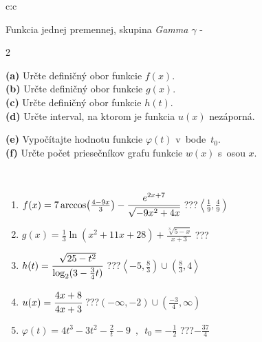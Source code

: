 \documentclass[10pt]{report}
\begin{document}
\begin{tabular}{c:c}
\begin{minipage}[c][104.5mm][t]{0.5\linewidth}
\begin{center}
\vspace{7mm}
{\huge Funkcia jednej premennej, skupina \textit{Gamma $\gamma$} -}\\[5mm]
\begin{minipage}{0.95\linewidth}
\begin{center}
{\small \begin{multicols}{2} \raggedright
\textbf{(a)} Určte definičný obor funkcie \(f(x)\). \\[1mm]
\textbf{(b)} Určte definičný obor funkcie \(g(x)\). \\[1mm]
\textbf{(c)} Určte definičný obor funkcie \(h(t)\). \\[1mm]
\textbf{(d)} Určte interval, na ktorom je funkcia \(u(x)\) nezáporná. \par \columnbreak
\textbf{(e)} Vypočítajte hodnotu funkcie \(\varphi(t)\) v~bode~\(t_0\). \\[1mm]
\textbf{(f)} Určte počet priesečníkov grafu funkcie \(w(x)\) s~osou \(x\). \\[1mm]
\end{multicols}
}
\end{center}
\end{minipage}
\\[4mm]
\begin{minipage}{0.79\linewidth}
\begin{center}
\begin{varwidth}{\linewidth}
\begin{enumerate}
\small
\item $f(x) = 7\arccos\!\left( \frac{4-9x}{3} \right) - \cfrac{e^{2x+7}}{\sqrt{-9x^2+4x}}$\quad \dotfill\; ???\;\dotfill \quad $\left\langle\frac{1}{9} , \frac{4}{9}\right)$
\item $g(x) = \frac{1}{3} \ln{\!(x^2+11x+28)}+\frac{\sqrt[3]{5-x}}{x+3}$\quad \dotfill\; ???\;\dotfill {}
\item $h(t) = \cfrac{\sqrt{25-t^2}}{\log_2(3-\frac{3}{4}t)}$\quad \dotfill\; ???\;\dotfill \quad $\left\langle-5 , \frac{8}{3}\right)\cup\left(\frac{8}{3} , 4\right\rangle$
\item $u(x) = \cfrac{4x+8}{4x+3}$\quad \dotfill\; ???\;\dotfill \quad $\left(-\infty , -2\right)\cup\left(\frac{-3}{4} , \infty\right)$
\item $\varphi(t) = 4t^3-3t^2-\frac{2}{t}-9 \enspace , \enspace t_0=-\frac{1}{2}$\quad \dotfill\; ???\;\dotfill \quad $-\frac{37}{4}$

\end{enumerate}
\end{varwidth}
\end{center}
\end{minipage}
\end{center}
\end{minipage}
\end{tabular}
\end{document}
